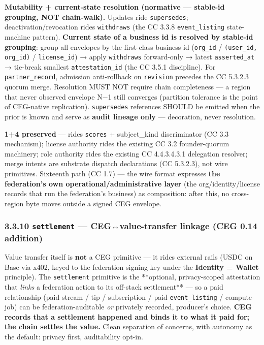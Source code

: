 \documentclass[11pt]{article}
\begin{document}
\textbf{Mutability + current-state resolution (normative — stable-id grouping, NOT chain-walk).} Updates ride \texttt{supersedes}; deactivation/revocation rides \texttt{withdraws} (the CC 3.3.8 \texttt{event\_listing} state-machine pattern). \textbf{Current state of a business id is resolved by stable-id grouping}: group all envelopes by the first-class business id (\texttt{org\_id} / \texttt{(user\_id, org\_id)} / \texttt{license\_id}) → apply \texttt{withdraws} forward-only → latest \texttt{asserted\_at} → tie-break smallest \texttt{attestation\_id} (the CC 3.5.1 discipline). For \texttt{partner\_record}, admission anti-rollback on \texttt{revision} precedes the CC 5.3.2.3 quorum merge. Resolution MUST NOT require chain completeness — a region that never observed envelope N−1 still converges (partition tolerance is the point of CEG-native replication). \texttt{supersedes} references SHOULD be emitted when the prior is known and serve as \textbf{audit lineage only} — decoration, never resolution.


\textbf{1+4 preserved} — rides \texttt{scores} + subject\_kind discriminator (CC 3.3 mechanism); license authority rides the existing CC 3.2 founder-quorum machinery; role authority rides the existing CC 4.4.3.4.3.1 delegation resolver; merge intents are substrate dispatch declarations (CC 5.3.2.3), not wire primitives. Sixteenth path (CC 1.7) — the wire format expresses \textbf{the federation's own operational/administrative layer} (the org/identity/license records that run the federation's business) as composition: after this, no cross-region byte moves outside a signed CEG envelope.


\subsubsection*{3.3.10 \texttt{settlement} — CEG↔value-transfer linkage (CEG 0.14 addition)}


Value transfer itself is \textbf{not} a CEG primitive — it rides external rails (USDC on Base via x402, keyed to the federation signing key under the \textbf{Identity = Wallet} principle). The \texttt{settlement} primitive is the **optional, privacy-scoped attestation that \textit{links} a federation action to its off-stack settlement** — so a paid relationship (paid stream / tip / subscription / paid \texttt{event\_listing} / compute-job) can be federation-auditable \textit{or} privately recorded, producer's choice. \textbf{CEG records that a settlement happened and binds it to what it paid for; the chain settles the value.} Clean separation of concerns, with autonomy as the default: privacy first, auditability opt-in.
\end{document}
